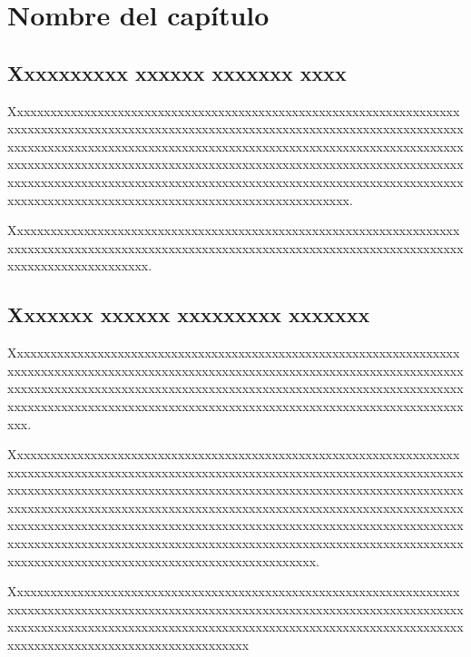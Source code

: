 \chapter{Nombre del capítulo}

\section{Xxxxxxxxxx xxxxxx xxxxxxx xxxx}

Xxxxxxxxxxxxxxxxxxxxxxxxxxxxxxxxxxxxxxxxxxxxxxxxxxxxxxxxxxxxxxxxxxxxxxxxxxxxxxxxxxxxxxxxxxxxxxxxxxxxxxxxxxxxxxxxxxxxxxxxxxxxxxxxxxxxxxxxxxxxxxxxxxxxxxxxxxxxxxxxxxxxxxxxxxxxxxxxxxxxxxxxxxxxxxxxxxxxxxxxxxxxxxxxxxxxxxxxxxxxxxxxxxxxxxxxxxxxxxxxxxxxxxxxxxxxxxxxxxxxxxxxxxxxxxxxxxxxxxxxxxxxxxxxxxxxxxxxxxxxxxxxxxxxxxxxxxxxxxxxxxxxxxxxxxxxxxxxxxxxxxxxxxxxxxxxxxxxxxxxxxxxxxxxxxxxxxxxxxxxxxxxxxxxxx.

Xxxxxxxxxxxxxxxxxxxxxxxxxxxxxxxxxxxxxxxxxxxxxxxxxxxxxxxxxxxxxxxxxxxxxxxxxxxxxxxxxxxxxxxxxxxxxxxxxxxxxxxxxxxxxxxxxxxxxxxxxxxxxxxxxxxxxxxxxxxxxxxxxxxxxxxxxxxx.

\section{Xxxxxxx xxxxxx xxxxxxxxx xxxxxxx}

Xxxxxxxxxxxxxxxxxxxxxxxxxxxxxxxxxxxxxxxxxxxxxxxxxxxxxxxxxxxxxxxxxxxxxxxxxxxxxxxxxxxxxxxxxxxxxxxxxxxxxxxxxxxxxxxxxxxxxxxxxxxxxxxxxxxxxxxxxxxxxxxxxxxxxxxxxxxxxxxxxxxxxxxxxxxxxxxxxxxxxxxxxxxxxxxxxxxxxxxxxxxxxxxxxxxxxxxxxxxxxxxxxxxxxxxxxxxxxxxxxxxxxxxxxxxxxxxxxxxxxxxxxxxxxxxxxx.

Xxxxxxxxxxxxxxxxxxxxxxxxxxxxxxxxxxxxxxxxxxxxxxxxxxxxxxxxxxxxxxxxxxxxxxxxxxxxxxxxxxxxxxxxxxxxxxxxxxxxxxxxxxxxxxxxxxxxxxxxxxxxxxxxxxxxxxxxxxxxxxxxxxxxxxxxxxxxxxxxxxxxxxxxxxxxxxxxxxxxxxxxxxxxxxxxxxxxxxxxxxxxxxxxxxxxxxxxxxxxxxxxxxxxxxxxxxxxxxxxxxxxxxxxxxxxxxxxxxxxxxxxxxxxxxxxxxxxxxxxxxxxxxxxxxxxxxxxxxxxxxxxxxxxxxxxxxxxxxxxxxxxxxxxxxxxxxxxxxxxxxxxxxxxxxxxxxxxxxxxxxxxxxxxxxxxxxxxxxxxxxxxxxxxxxxxxxxxxxxxxxxxxxxxxxxxxxxxxxxxxxxxxxxxxxxxxxxxxxxxxxxxxxxxxxxxx.

Xxxxxxxxxxxxxxxxxxxxxxxxxxxxxxxxxxxxxxxxxxxxxxxxxxxxxxxxxxxxxxxxxxxxxxxxxxxxxxxxxxxxxxxxxxxxxxxxxxxxxxxxxxxxxxxxxxxxxxxxxxxxxxxxxxxxxxxxxxxxxxxxxxxxxxxxxxxxxxxxxxxxxxxxxxxxxxxxxxxxxxxxxxxxxxxxxxxxxxxxxxxxxxxxxxxxxxxxxxxxxxxxxxxxxxxxxxxxxxx